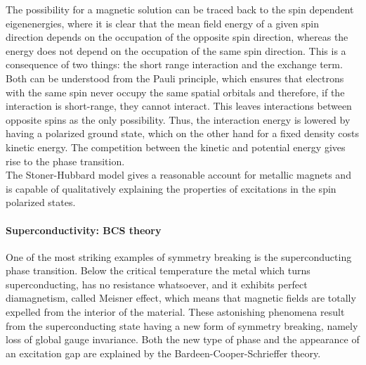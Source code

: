 The possibility for a magnetic solution can be traced back to the spin dependent eigenenergies, where it is clear that the mean field energy of a given spin direction depends on the occupation of the opposite spin direction, whereas the energy does not depend on the occupation of the same spin direction. This is a consequence of two things: the short range interaction and the exchange term. Both can be understood from the Pauli principle, which ensures that electrons with the same spin never occupy the same spatial orbitals and therefore, if the interaction is short-range, they cannot interact. This leaves interactions between opposite spins as the only possibility. Thus, the interaction energy is lowered by having a polarized ground state, which on the other hand for a fixed density costs kinetic energy. The competition between the kinetic and potential energy gives rise to the phase transition. \\

The Stoner-Hubbard model gives a reasonable account for metallic magnets and is capable of qualitatively explaining the properties of excitations in the spin polarized states. \\


\paragraph{\textbf{Superconductivity: BCS theory}}

One of the most striking examples of symmetry breaking is the superconducting phase transition. Below the critical temperature the metal which turns superconducting, has no resistance whatsoever, and it exhibits perfect diamagnetism, called Meisner effect, which means that magnetic fields are totally expelled from the interior of the material. These astonishing phenomena result from the superconducting state having a new form of symmetry breaking, namely loss of global gauge invariance. Both the new type of phase and the appearance of an excitation gap are explained by the Bardeen-Cooper-Schrieffer theory. \\

